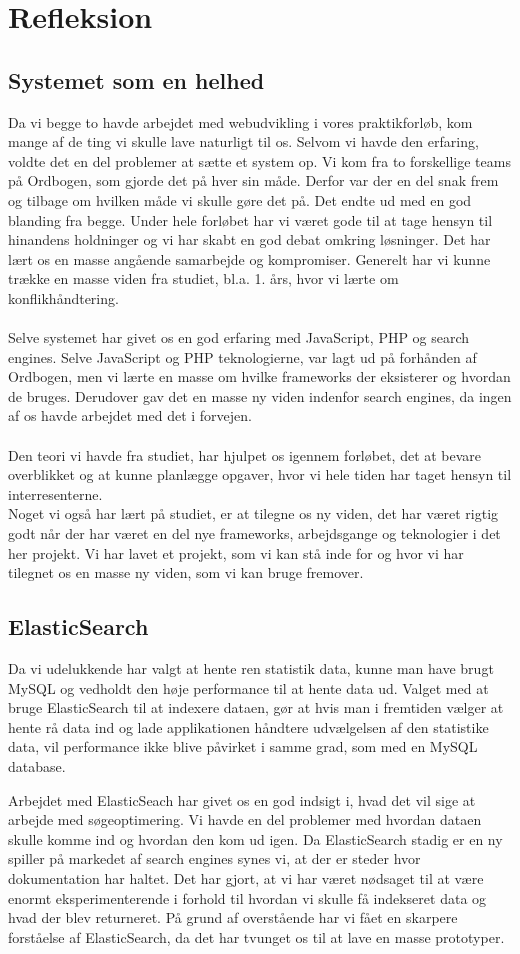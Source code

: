 \section{Refleksion}
\subsection{Systemet som en helhed}
Da vi begge to havde arbejdet med webudvikling i vores praktikforløb, kom mange af de ting vi skulle lave naturligt til os.
Selvom vi havde den erfaring, voldte det en del problemer at sætte et system op. Vi kom fra to forskellige teams på Ordbogen, som gjorde det på hver sin måde. Derfor var der en del snak frem og tilbage om hvilken måde vi skulle gøre det på. Det endte ud med en god blanding fra begge. Under hele forløbet har vi været gode til at tage hensyn til hinandens holdninger og vi har skabt en god debat omkring løsninger. Det har lært os en masse angående samarbejde og kompromiser. Generelt har vi kunne trække en masse viden fra studiet, bl.a. 1. års, hvor vi lærte om konflikhåndtering.
\\\\
Selve systemet har givet os en god erfaring med JavaScript, PHP og search engines. 
Selve JavaScript og PHP teknologierne, var lagt ud på forhånden af Ordbogen,
men vi lærte en masse om hvilke frameworks der eksisterer og hvordan de bruges.
Derudover gav det en masse ny viden indenfor search engines, da ingen af os havde arbejdet med det i forvejen.
\\\\
Den teori vi havde fra studiet, har hjulpet os igennem forløbet, det at bevare overblikket og at kunne planlægge opgaver, hvor vi hele tiden har taget hensyn til interresenterne.
\\
Noget vi også har lært på studiet, er at tilegne os ny viden, det har været rigtig godt når
der har været en del nye frameworks, arbejdsgange og teknologier i det her projekt.
Vi har lavet et projekt, som vi kan stå inde for og hvor vi har tilegnet os en masse ny viden, som vi kan bruge fremover.
\subsection{ElasticSearch}
Da vi udelukkende har valgt at hente ren statistik data, kunne man have brugt MySQL og vedholdt den høje performance til at hente data ud. 
Valget med at bruge ElasticSearch til at indexere dataen, gør at hvis man i fremtiden vælger at hente rå data ind og lade applikationen håndtere
udvælgelsen af den statistike data, vil performance ikke blive påvirket i samme grad, som med en MySQL database.

Arbejdet med ElasticSeach har givet os en god indsigt i, hvad det vil sige at arbejde med søgeoptimering.
Vi havde en del problemer med hvordan dataen skulle komme ind og hvordan den kom ud igen. 
Da ElasticSearch stadig er en ny spiller på markedet af search engines synes vi, at der er steder hvor dokumentation har haltet.
Det har gjort, at vi har været nødsaget til at være enormt eksperimenterende i forhold til hvordan vi skulle få indekseret data og hvad der blev returneret.
På grund af overstående har vi fået en skarpere forståelse af ElasticSearch, da det har tvunget os til at lave en masse prototyper.

